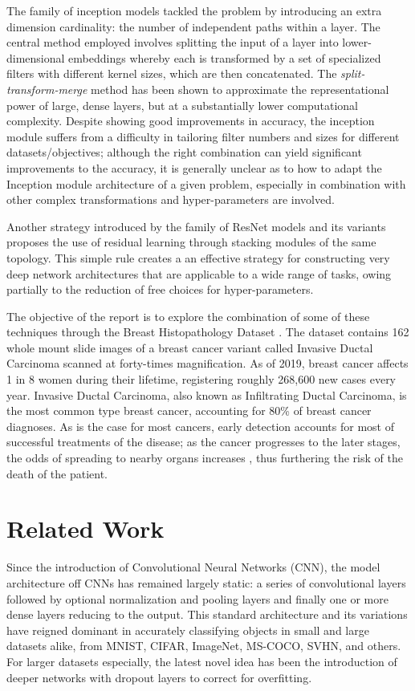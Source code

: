 \documentclass[conference]{IEEEtran}
\begin{document}
The family of inception models \cite{Szegedy2014, Szegedy2015, Szegedy2016} tackled the problem by introducing an extra dimension cardinality: the number of independent paths within a layer. The central method employed involves splitting the input of a layer into lower-dimensional embeddings whereby each is transformed by a set of specialized filters with different kernel sizes, which are then concatenated. The \emph{split-transform-merge} method has been shown to approximate the representational power of large, dense layers, but at a substantially lower computational complexity. Despite showing good improvements in accuracy, the inception module suffers from a difficulty in tailoring filter numbers and sizes for different datasets/objectives; although the right combination can yield significant improvements to the accuracy, it is generally unclear as to how to adapt the Inception module architecture of a given problem, especially in combination with other complex transformations and hyper-parameters are involved.

Another strategy introduced by the family of ResNet models and its variants proposes the use of residual learning through stacking modules of the same topology. This simple rule creates a an effective strategy for constructing very deep network architectures that are applicable to a wide range of tasks, owing partially to the reduction of free choices for hyper-parameters.

The objective of the report is to explore the combination of some of these techniques \cite{Szegedy2014, He2016} through the Breast Histopathology Dataset \cite{Mooney2017}. The dataset contains 162 whole mount slide images of a breast cancer variant called Invasive Ductal Carcinoma scanned at forty-times magnification. As of 2019, breast cancer affects 1 in 8 \cite{DeSantis2019} women during their lifetime, registering roughly 268,600 new cases every year. Invasive Ductal Carcinoma, also known as Infiltrating Ductal Carcinoma, is the most common type breast cancer, accounting for 80\% \cite{Sharma2010} of breast cancer diagnoses. As is the case for most cancers, early detection accounts for most of successful treatments of the disease; as the cancer progresses to the later stages, the odds of spreading to nearby organs increases \cite{Milosevic2018}, thus furthering the risk of the death of the patient.

\section{Related Work}
Since the introduction of Convolutional Neural Networks (CNN), the model architecture off CNNs has remained largely static: a series of convolutional layers followed by optional normalization and pooling layers and finally one or more dense layers reducing to the output. This standard architecture and its variations have reigned dominant in accurately classifying objects in small and large datasets alike, from MNIST, CIFAR, ImageNet, MS-COCO, SVHN, and others. For larger datasets especially, the latest novel idea has been the introduction of deeper networks with dropout layers to correct for overfitting.
\end{document}
